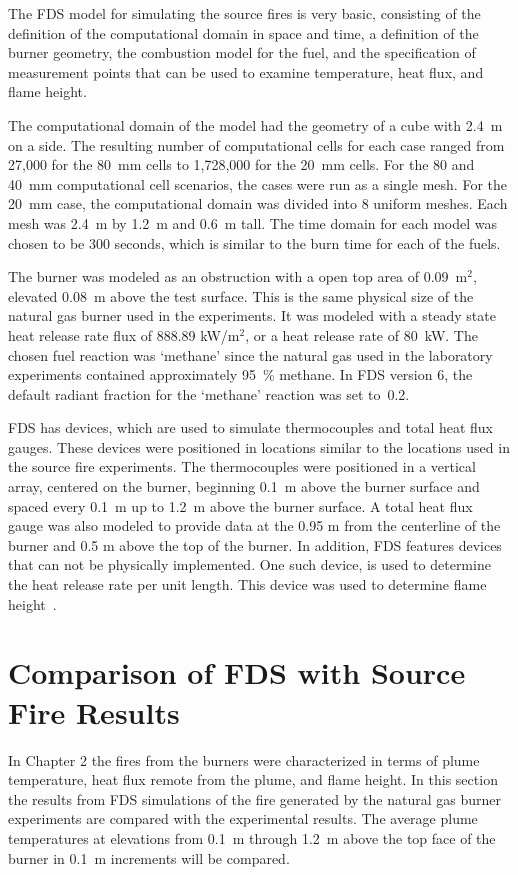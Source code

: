 \documentclass[twoside]{uocthesis}
\begin{document}
{The FDS model for simulating the source fires is very basic, consisting of the definition of the computational domain in space and time, a definition of the burner geometry, the combustion model for the fuel, and the specification of measurement points that can be used to examine temperature, heat flux, and flame height.

The computational domain of the model had the geometry of a cube with 2.4~m on a side.  The resulting number of computational cells for each case ranged from 27,000 for the 80~mm cells to 1,728,000 for the 20~mm cells. For the 80 and 40~mm computational cell scenarios, the cases were run as a single mesh.  For the 20~mm case, the computational domain was divided into 8 uniform meshes.  Each mesh was 2.4~m by 1.2~m and 0.6~m tall.  The time domain for each model was chosen to be 300 seconds, which is similar to the burn time for each of the fuels.    

The burner was modeled as an obstruction with a open top area of 0.09~m$^2$, elevated 0.08~m above the test surface.  This is the same physical size of the natural gas burner used in the experiments.  It was modeled with a steady state heat release rate flux of 888.89 kW/m$^2$, or a heat release rate of 80~kW.   The chosen fuel reaction was `methane' since the natural gas used in the laboratory experiments contained approximately 95~\% methane.  In FDS version 6, the default radiant fraction for the `methane' reaction was set to~0.2.  

FDS has devices, which are used to simulate thermocouples and total heat flux gauges.  These devices were positioned in locations similar to the locations used in the source fire experiments.  The thermocouples were positioned in a vertical array, centered on the burner, beginning 0.1~m above the burner surface and spaced every 0.1~m up to 1.2~m above the burner surface.  A total heat flux gauge was also modeled to provide data at the 0.95 m from the centerline of the burner and 0.5 m above the top of the burner.  
In addition, FDS features devices that can not be physically implemented.  One such device, is used to determine the heat release rate per unit length.  This device was used to determine flame height~\cite{McDermott:2011}. 

\section{Comparison of FDS with Source Fire Results}

In Chapter 2 the fires from the burners were characterized in terms of plume temperature, heat flux remote from the plume, and flame height.  In this section the results from FDS simulations of the fire generated by the natural gas burner experiments are compared with the experimental results.  The average plume temperatures at elevations from 0.1~m through 1.2~m above the top face of the burner in 0.1~m increments will be compared.   

}
\end{document}
